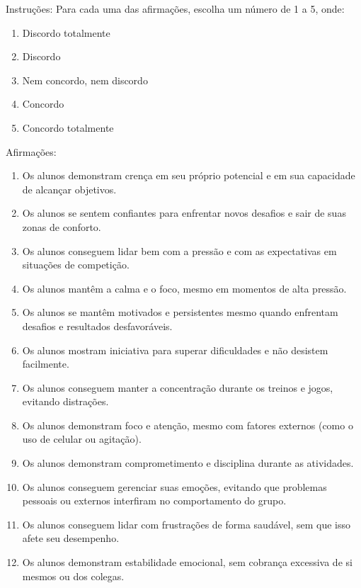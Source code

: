 
Instruções: Para cada uma das afirmações, escolha um número de 1 a 5, onde:
\begin{enumerate}
    \item Discordo totalmente
    \item Discordo
    \item Nem concordo, nem discordo
    \item Concordo
    \item Concordo totalmente
\end{enumerate}

Afirmações:
\begin{enumerate}    
    \item Os alunos demonstram crença em seu próprio potencial e em sua capacidade de alcançar objetivos.
    \item Os alunos se sentem confiantes para enfrentar novos desafios e sair de suas zonas de conforto.
    \item Os alunos conseguem lidar bem com a pressão e com as expectativas em situações de competição.
    \item Os alunos mantêm a calma e o foco, mesmo em momentos de alta pressão.
    \item Os alunos se mantêm motivados e persistentes mesmo quando enfrentam desafios e resultados desfavoráveis.
    \item Os alunos mostram iniciativa para superar dificuldades e não desistem facilmente.
    \item Os alunos conseguem manter a concentração durante os treinos e jogos, evitando distrações.
    \item Os alunos demonstram foco e atenção, mesmo com fatores externos (como o uso de celular ou agitação).
    \item Os alunos demonstram comprometimento e disciplina durante as atividades.
    \item Os alunos conseguem gerenciar suas emoções, evitando que problemas pessoais ou externos interfiram no comportamento do grupo.
    \item Os alunos conseguem lidar com frustrações de forma saudável, sem que isso afete seu desempenho.
    \item Os alunos demonstram estabilidade emocional, sem cobrança excessiva de si mesmos ou dos colegas.
\end{enumerate}